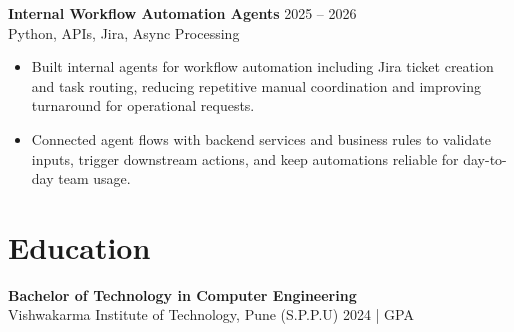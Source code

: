 \documentclass[10pt,letterpaper]{article}
\newcommand{\resumeSubheading}[4]{%
  \textbf{#1} \hfill #2 \\
  #3 \hfill #4 \\
}
\begin{document}
\resumeSubheading{Internal Workflow Automation Agents}{2025 -- 2026}{}{Python, APIs, Jira, Async Processing}
\begin{itemize}
    \item Built internal agents for workflow automation including Jira ticket creation and task routing, reducing repetitive manual coordination and improving turnaround for operational requests.
    \item Connected agent flows with backend services and business rules to validate inputs, trigger downstream actions, and keep automations reliable for day-to-day team usage.
\end{itemize}

\section*{Education}
\resumeSubheading{Bachelor of Technology in Computer Engineering}{}{Vishwakarma Institute of Technology, Pune (S.P.P.U)}{2024 \enspace | \enspace 8.8 GPA}
\end{document}
